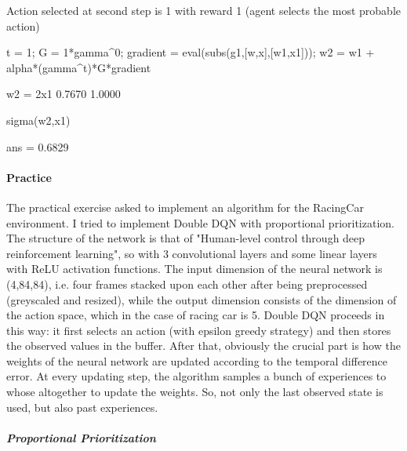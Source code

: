 \documentclass[12pt,a4paper]{extarticle}
\begin{document}
\begin{par}
\begin{flushleft}
Action selected at second step is 1 with reward 1 (agent selects the most probable action)
\end{flushleft}
\end{par}

\begin{matlabcode}
t = 1; 
G = 1*gamma^0;
gradient = eval(subs(g1,[w,x],[w1,x1]));
w2 = w1 + alpha*(gamma^t)*G*gradient
\end{matlabcode}
\begin{matlaboutput}
w2 = 2x1    
    0.7670
    1.0000

\end{matlaboutput}
\begin{matlabcode}
sigma(w2,x1)
\end{matlabcode}
\begin{matlaboutput}
ans = 0.6829
\end{matlaboutput}


\paragraph{Practice}

The practical exercise asked to implement an algorithm for the RacingCar environment. I tried to implement Double DQN with proportional prioritization. The structure of the network is that of "Human-level control through deep reinforcement learning", so with 3 convolutional layers and some linear layers with ReLU activation functions. The input dimension of the neural network is (4,84,84), i.e. four frames stacked upon each other after being preprocessed (greyscaled and resized), while the output dimension consists of the dimension of the action space, which in the case of racing car is 5. Double DQN proceeds in this way: it first selects an action (with epsilon greedy strategy) and then stores the observed values in the buffer. After that, obviously the crucial part is how the weights of the neural network are updated according to the temporal difference error. At every updating step, the algorithm samples a bunch of experiences to whose altogether to update the weights. So, not only the last observed state is used, but also past experiences.

\subparagraph{Proportional Prioritization}
\end{document}

